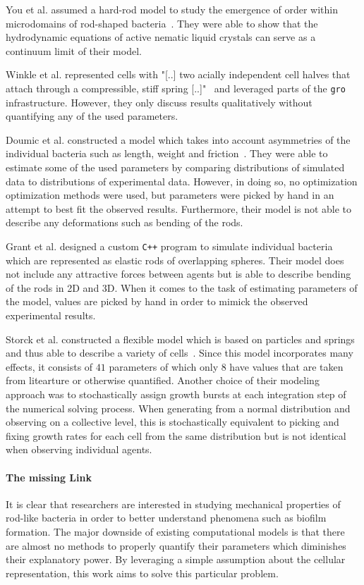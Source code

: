 \documentclass{article}
\begin{document}
You et al. assumed a hard-rod model to study the emergence of order within microdomains  of
rod-shaped bacteria~\cite{You2018}.
They were able to show that the hydrodynamic equations of active nematic liquid crystals can serve
as a continuum limit of their model.

Winkle et al. represented cells with "[..] two acially independent cell halves that attach through a
compressible, stiff spring [..]"~\cite{Winkle2017} and leveraged parts of the \texttt{gro}
infrastructure.
However, they only discuss results qualitatively without quantifying any of the used parameters.

Doumic et al. constructed a model which takes into account asymmetries of the individual bacteria
such as length, weight and friction~\cite{Doumic2020}.
They were able to estimate some of the used parameters by comparing distributions of simulated data
to distributions of experimental data.
However, in doing so, no optimization optimization methods were used, but parameters were picked by
hand in an attempt to best fit the observed results.
Furthermore, their model is not able to describe any deformations such as bending of the rods.

Grant et al. designed a custom \texttt{C++} program to simulate individual
bacteria~\cite{Grant2014} which are represented as elastic rods of overlapping spheres.
Their model does not include any attractive forces between agents but is able to describe bending of
the rods in 2D and 3D.
When it comes to the task of estimating parameters of the model, values are picked by hand in order
to mimick the observed experimental results.

Storck et al. constructed a flexible model which is based on particles and springs and thus able to
describe a variety of cells~\cite{Storck2014}.
Since this model incorporates many effects, it consists of $41$ parameters of which only $8$ have
values that are taken from litearture or otherwise quantified.
Another choice of their modeling approach was to stochastically assign growth bursts at each
integration step of the numerical solving process.
When generating from a normal distribution and observing on a collective level, this is
stochastically equivalent to picking and fixing growth rates for each cell from the same
distribution but is not identical when observing individual agents.

\paragraph{The missing Link}
It is clear that researchers are interested in studying mechanical properties of rod-like bacteria
in order to better understand phenomena such as biofilm formation.
The major downside of existing computational models is that there are almost no methods to properly
quantify their parameters which diminishes their explanatory power.
By leveraging a simple assumption about the cellular representation, this work aims to solve this
particular problem.
\end{document}
